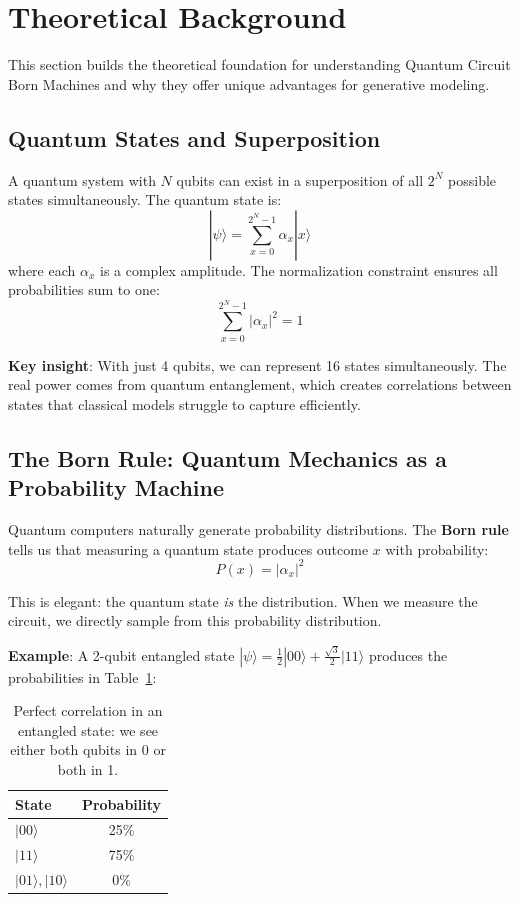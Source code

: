 \documentclass[11pt,a4paper]{article}
\begin{document}
\clearpage
\section{Theoretical Background}

This section builds the theoretical foundation for understanding Quantum Circuit Born Machines and why they offer unique advantages for generative modeling.

\subsection{Quantum States and Superposition}

A quantum system with $N$ qubits can exist in a superposition of all $2^N$ possible states simultaneously. The quantum state is:
\[
|\psi\rangle = \sum_{x=0}^{2^N-1} \alpha_x |x\rangle
\]
where each $\alpha_x$ is a complex amplitude. The normalization constraint ensures all probabilities sum to one:
\[
\sum_{x=0}^{2^N-1} |\alpha_x|^2 = 1
\]

\textbf{Key insight}: With just 4 qubits, we can represent 16 states simultaneously. The real power comes from quantum entanglement, which creates correlations between states that classical models struggle to capture efficiently.

\subsection{The Born Rule: Quantum Mechanics as a Probability Machine}

Quantum computers naturally generate probability distributions. The \textbf{Born rule} tells us that measuring a quantum state produces outcome $x$ with probability:
\[
P(x) = |\alpha_x|^2
\]

This is elegant: the quantum state \textit{is} the distribution. When we measure the circuit, we directly sample from this probability distribution.

\textbf{Example}: A 2-qubit entangled state $|\psi\rangle = \frac{1}{2}|00\rangle + \frac{\sqrt{3}}{2}|11\rangle$ produces the probabilities in Table~\ref{tab:born_example}:

\begin{table}[H]
\centering
\begin{tabular}{lc}
\toprule
\textbf{State} & \textbf{Probability} \\
\midrule
$|00\rangle$ & 25\% \\
$|11\rangle$ & 75\% \\
$|01\rangle, |10\rangle$ & 0\% \\
\bottomrule
\end{tabular}
\caption{Perfect correlation in an entangled state: we see either both qubits in 0 or both in 1.}
\label{tab:born_example}
\end{table}
\end{document}
